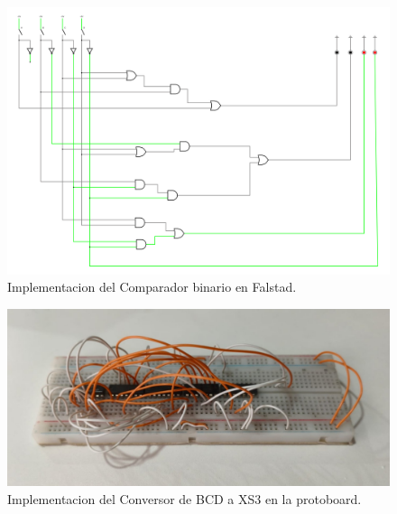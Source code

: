 \documentclass[]{informeutn}
\begin{document}
    \begin{figure}[!ht]
      \centering
      \includegraphics[width=1\textwidth]{images/ej1.png}
      \caption{Implementacion del Comparador binario en Falstad.}
      \label{falstad.ej1}
    \end{figure}

    \begin{figure}[!ht]
      \centering
      \includegraphics[width=.8\textwidth]{pictures/prot-ej1.jpeg}
      \caption{Implementacion del Conversor de BCD a XS3 en la protoboard.}
      \label{crkt.ej1.prot}
    \end{figure}

    
\end{document}
